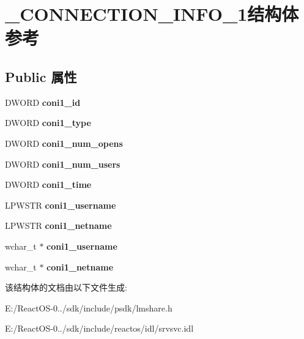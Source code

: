\hypertarget{struct___c_o_n_n_e_c_t_i_o_n___i_n_f_o__1}{}\section{\+\_\+\+C\+O\+N\+N\+E\+C\+T\+I\+O\+N\+\_\+\+I\+N\+F\+O\+\_\+1结构体 参考}
\label{struct___c_o_n_n_e_c_t_i_o_n___i_n_f_o__1}
\subsection*{Public 属性}
\begin{DoxyCompactItemize}
\item 
\mbox{\label{struct___c_o_n_n_e_c_t_i_o_n___i_n_f_o__1_abc4fc512afe5025b435a0601ff5fdcdb}} 
D\+W\+O\+RD {\bfseries coni1\+\_\+id}
\item 
\mbox{\label{struct___c_o_n_n_e_c_t_i_o_n___i_n_f_o__1_a1fecbdf21c41adbbf11742c2c47d8018}} 
D\+W\+O\+RD {\bfseries coni1\+\_\+type}
\item 
\mbox{\label{struct___c_o_n_n_e_c_t_i_o_n___i_n_f_o__1_ad00dcf226a600cf77c4e5e3ac9a7c35f}} 
D\+W\+O\+RD {\bfseries coni1\+\_\+num\+\_\+opens}
\item 
\mbox{\label{struct___c_o_n_n_e_c_t_i_o_n___i_n_f_o__1_ad86c10005bf6de8cd94a609563097bef}} 
D\+W\+O\+RD {\bfseries coni1\+\_\+num\+\_\+users}
\item 
\mbox{\label{struct___c_o_n_n_e_c_t_i_o_n___i_n_f_o__1_a27734435d54144c53980e43180373123}} 
D\+W\+O\+RD {\bfseries coni1\+\_\+time}
\item 
\mbox{\label{struct___c_o_n_n_e_c_t_i_o_n___i_n_f_o__1_a00ab9b32f0d7f5370fe77d69e9a09137}} 
L\+P\+W\+S\+TR {\bfseries coni1\+\_\+username}
\item 
\mbox{\label{struct___c_o_n_n_e_c_t_i_o_n___i_n_f_o__1_a680d7e6d55e1a8c692ab6f8fa24a63a2}} 
L\+P\+W\+S\+TR {\bfseries coni1\+\_\+netname}
\item 
\mbox{\label{struct___c_o_n_n_e_c_t_i_o_n___i_n_f_o__1_a416f0f26f44b7f67debd18d8df8f8cee}} 
wchar\+\_\+t $\ast$ {\bfseries coni1\+\_\+username}
\item 
\mbox{\label{struct___c_o_n_n_e_c_t_i_o_n___i_n_f_o__1_a5c1d22f955d072770486f7327d039139}} 
wchar\+\_\+t $\ast$ {\bfseries coni1\+\_\+netname}
\end{DoxyCompactItemize}


该结构体的文档由以下文件生成\+:\begin{DoxyCompactItemize}
\item 
E\+:/\+React\+O\+S-\/0../sdk/include/psdk/lmshare.\+h\item 
E\+:/\+React\+O\+S-\/0../sdk/include/reactos/idl/srvsvc.\+idl\end{DoxyCompactItemize}
